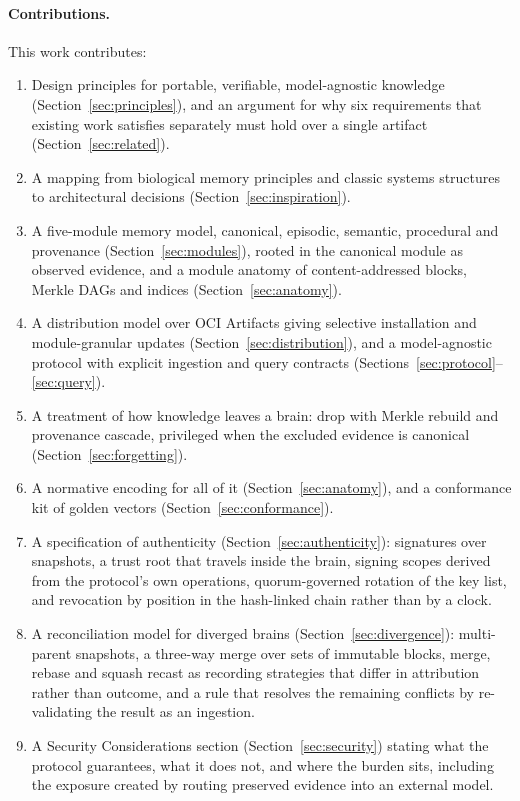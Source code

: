 \documentclass[11pt,a4paper]{article}
\begin{document}
\paragraph{Contributions.}
This work contributes:
\begin{enumerate}[leftmargin=1.4em]
  \item Design principles for portable, verifiable, model-agnostic knowledge
  (Section~\ref{sec:principles}), and an argument for why six requirements that
  existing work satisfies separately must hold over a single artifact
  (Section~\ref{sec:related}).
  \item A mapping from biological memory principles and classic systems
  structures to architectural decisions (Section~\ref{sec:inspiration}).
  \item A five-module memory model, canonical, episodic, semantic, procedural
  and provenance (Section~\ref{sec:modules}), rooted in the canonical module as
  observed evidence, and a module anatomy of content-addressed blocks, Merkle
  DAGs and indices (Section~\ref{sec:anatomy}).
  \item A distribution model over OCI Artifacts giving selective installation
and module-granular updates (Section~\ref{sec:distribution}), and a
  model-agnostic protocol with explicit ingestion and query contracts
  (Sections~\ref{sec:protocol}--\ref{sec:query}).
  \item A treatment of how knowledge leaves a brain: drop with Merkle rebuild
and provenance cascade, privileged when the excluded evidence is canonical
(Section~\ref{sec:forgetting}). \item A normative encoding for all of it
(Section~\ref{sec:anatomy}), and a conformance kit of golden vectors
(Section~\ref{sec:conformance}).
  \item A specification of authenticity (Section~\ref{sec:authenticity}):
  signatures over snapshots, a trust root that travels inside the brain, signing
  scopes derived from the protocol's own operations, quorum-governed rotation of
  the key list, and revocation by position in the hash-linked chain rather than
  by a clock.
  \item A reconciliation model for diverged brains
  (Section~\ref{sec:divergence}): multi-parent snapshots, a three-way merge over
  sets of immutable blocks, merge, rebase and squash recast as recording
  strategies that differ in attribution rather than outcome, and a rule that
  resolves the remaining conflicts by re-validating the result as an ingestion.
  \item A Security Considerations section (Section~\ref{sec:security}) stating
  what the protocol guarantees, what it does not, and where the burden sits,
  including the exposure created by routing preserved evidence into an external
  model.
\end{enumerate}
\end{document}
